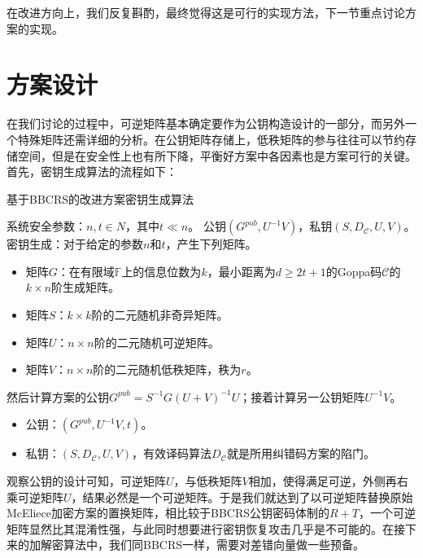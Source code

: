 在改进方向上，我们反复斟酌，最终觉得这是可行的实现方法，下一节重点讨论方案的实现。

\section{方案设计}
在我们讨论的过程中，可逆矩阵基本确定要作为公钥构造设计的一部分，而另外一个特殊矩阵还需详细的分析。在公钥矩阵存储上，低秩矩阵的参与往往可以节约存储空间，但是在安全性上也有所下降，平衡好方案中各因素也是方案可行的关键。首先，密钥生成算法的流程如下：

\begin{breakablealgorithm}
	\small
	\renewcommand{\algorithmicrequire}{\textbf{Input:}}
	\renewcommand{\algorithmicensure}{\textbf{Output:}}
	\caption{基于BBCRS的改进方案密钥生成算法}
	\label{alg:NewKeyGen}
	\begin{algorithmic}[1]
		\Require
		系统安全参数：$n,t \in N$，其中$t \ll n$。
		\Ensure
		公钥$(G^{pub},U^{-1}V)$，私钥$(S,D_\mathcal{C},U,V)$。
		\State
		密钥生成：对于给定的参数$n$和$t$，产生下列矩阵。
		\begin{itemize}
			\item 矩阵$G$：在有限域$\mathbb{F}$上的信息位数为$k$，最小距离为$d \geq 2t + 1$的Goppa码$\mathcal{C}$的$k \times n$阶生成矩阵。
			\item 矩阵$S$：$k \times k$阶的二元随机非奇异矩阵。
			\item 矩阵$U$：$n \times n$阶的二元随机可逆矩阵。
			\item 矩阵$V$：$n \times n$阶的二元随机低秩矩阵，秩为$r$。
		\end{itemize}
		\State
		然后计算方案的公钥$G^{pub} = S^{-1}G(U + V)^{-1}U$；接着计算另一公钥矩阵$U^{-1}V$。
		\begin{itemize}
			\item 公钥：$(G^{pub},U^{-1}V,t)$。
			\item 私钥：$(S,D_\mathcal{C},U,V)$，有效译码算法$D_\mathcal{C}$就是所用纠错码方案的陷门。
		\end{itemize}
	\end{algorithmic}
\end{breakablealgorithm}

观察公钥的设计可知，可逆矩阵$U$，与低秩矩阵$V$相加，使得满足可逆，外侧再右乘可逆矩阵$U$，结果必然是一个可逆矩阵。于是我们就达到了以可逆矩阵替换原始McEliece加密方案的置换矩阵，相比较于BBCRS公钥密码体制的$R+T$，一个可逆矩阵显然比其混淆性强，与此同时想要进行密钥恢复攻击几乎是不可能的。在接下来的加解密算法中，我们同BBCRS一样，需要对差错向量做一些预备。

